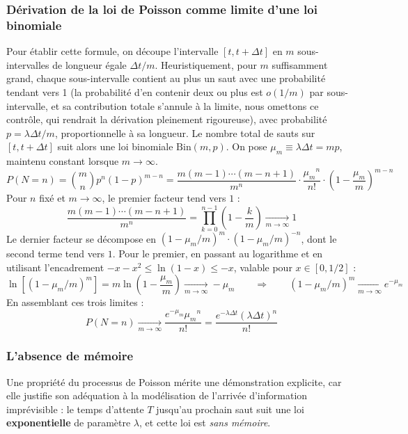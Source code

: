 \documentclass{article}
\begin{document}
\subsubsection*{Dérivation de la loi de Poisson comme limite d'une loi binomiale}
Pour établir cette formule, on découpe l'intervalle $[t,t+\Delta t]$ en $m$ sous-intervalles de longueur égale $\Delta t/m$. Heuristiquement, pour $m$ suffisamment grand, chaque sous-intervalle contient au plus un saut avec une probabilité tendant vers 1 (la probabilité d'en contenir deux ou plus est $o(1/m)$ par sous-intervalle, et sa contribution totale s'annule à la limite, nous omettons ce contrôle, qui rendrait la dérivation pleinement rigoureuse), avec probabilité $p = \lambda\Delta t/m$, proportionnelle à sa longueur. Le nombre total de sauts sur $[t,t+\Delta t]$ suit alors une loi binomiale $\text{Bin}(m,p)$. On pose $\mu_m \equiv \lambda\Delta t = mp$, maintenu constant lorsque $m\to\infty$.
\begin{equation}
P(N=n) = \binom{m}{n} p^n(1-p)^{m-n} = \frac{m(m-1)\cdots(m-n+1)}{m^n}\cdot\frac{{\mu_m}^n}{n!}\cdot\left(1-\frac{\mu_m}{m}\right)^{m-n}
\end{equation}
Pour $n$ fixé et $m\to\infty$, le premier facteur tend vers $1$ :
\begin{equation}
\frac{m(m-1)\cdots(m-n+1)}{m^n} = \prod_{k=0}^{n-1}\left(1-\frac{k}{m}\right) \xrightarrow[m\to\infty]{} 1
\end{equation}
Le dernier facteur se décompose en $(1-\mu_m/m)^m \cdot (1-\mu_m/m)^{-n}$, dont le second terme tend vers $1$. Pour le premier, en passant au logarithme et en utilisant l'encadrement $-x-x^2\leq\ln(1-x)\leq -x$, valable pour $x\in[0,1/2]$ :
\begin{equation}
\ln\left[(1-\mu_m/m)^m\right] = m\ln\left(1-\frac{\mu_m}{m}\right) \xrightarrow[m\to\infty]{} -\mu_m \qquad \Longrightarrow \qquad (1-\mu_m/m)^m \xrightarrow[m\to\infty]{} e^{-\mu_m}
\end{equation}
En assemblant ces trois limites :
\begin{equation}
P(N=n) \xrightarrow[m\to\infty]{} \frac{e^{-\mu_m}{\mu_m}^n}{n!} = \frac{e^{-\lambda\Delta t}(\lambda\Delta t)^n}{n!}
\end{equation}
\subsubsection*{L'absence de mémoire}
Une propriété du processus de Poisson mérite une démonstration explicite, car elle justifie son adéquation à la modélisation de l'arrivée d'information imprévisible : le temps d'attente $T$ jusqu'au prochain saut suit une loi \textbf{exponentielle} de paramètre $\lambda$, et cette loi est \emph{sans mémoire}.
\end{document}
